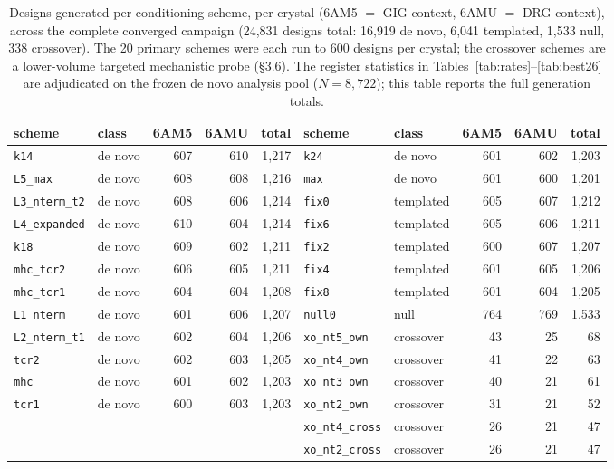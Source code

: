 \documentclass[letterpaper]{article}
\begin{document}
\begin{table}[t]
\centering
\small
\setlength{\tabcolsep}{5pt}
\renewcommand{\arraystretch}{1.05}
\begin{tabular}{@{}llrrr@{\hskip 2em}llrrr@{}}
\toprule
scheme & class & 6AM5 & 6AMU & total & scheme & class & 6AM5 & 6AMU & total \\
\midrule
\texttt{k14}         & de novo & 607 & 610 & 1{,}217 & \texttt{k24}         & de novo   & 601 & 602 & 1{,}203 \\
\texttt{L5\_max}     & de novo & 608 & 608 & 1{,}216 & \texttt{max}         & de novo   & 601 & 600 & 1{,}201 \\
\texttt{L3\_nterm\_t2} & de novo & 608 & 606 & 1{,}214 & \texttt{fix0}        & templated & 605 & 607 & 1{,}212 \\
\texttt{L4\_expanded} & de novo & 610 & 604 & 1{,}214 & \texttt{fix6}        & templated & 605 & 606 & 1{,}211 \\
\texttt{k18}         & de novo & 609 & 602 & 1{,}211 & \texttt{fix2}        & templated & 600 & 607 & 1{,}207 \\
\texttt{mhc\_tcr2}   & de novo & 606 & 605 & 1{,}211 & \texttt{fix4}        & templated & 601 & 605 & 1{,}206 \\
\texttt{mhc\_tcr1}   & de novo & 604 & 604 & 1{,}208 & \texttt{fix8}        & templated & 601 & 604 & 1{,}205 \\
\texttt{L1\_nterm}   & de novo & 601 & 606 & 1{,}207 & \texttt{null0}       & null      & 764 & 769 & 1{,}533 \\
\texttt{L2\_nterm\_t1} & de novo & 602 & 604 & 1{,}206 & \texttt{xo\_nt5\_own} & crossover & 43  & 25  & 68 \\
\texttt{tcr2}        & de novo & 602 & 603 & 1{,}205 & \texttt{xo\_nt4\_own} & crossover & 41  & 22  & 63 \\
\texttt{mhc}         & de novo & 601 & 602 & 1{,}203 & \texttt{xo\_nt3\_own} & crossover & 40  & 21  & 61 \\
\texttt{tcr1}        & de novo & 600 & 603 & 1{,}203 & \texttt{xo\_nt2\_own} & crossover & 31  & 21  & 52 \\
                     &         &     &     &         & \texttt{xo\_nt4\_cross} & crossover & 26 & 21 & 47 \\
                     &         &     &     &         & \texttt{xo\_nt2\_cross} & crossover & 26 & 21 & 47 \\
\bottomrule
\end{tabular}
\caption{Designs generated per conditioning scheme, per crystal (6AM5 $=$ GIG context, 6AMU $=$ DRG
context), across the complete converged campaign (24{,}831 designs total: 16{,}919 de novo, 6{,}041
templated, 1{,}533 null, 338 crossover). The 20 primary schemes were each run to 600 designs per crystal;
the crossover schemes are a lower-volume targeted mechanistic probe (\S3.6). The register statistics in
Tables~\ref{tab:rates}--\ref{tab:best26} are adjudicated on the frozen de novo analysis pool ($N=8{,}722$);
this table reports the full generation totals.}
\label{tab:campaign}
\end{table}
\end{document}
